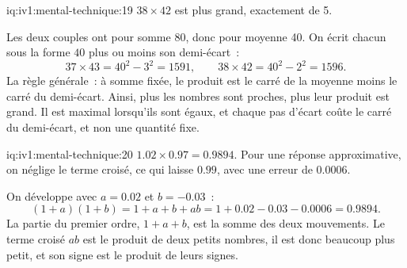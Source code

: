 \begin{solution}{iq:iv1:mental-technique:19}
$38 \times 42$ est plus grand, exactement de 5.

Les deux couples ont pour somme 80, donc pour moyenne 40. On écrit chacun sous la forme $40$ plus ou moins son demi-écart~:
\[
37 \times 43 = 40^2 - 3^2 = 1591, \qquad 38 \times 42 = 40^2 - 2^2 = 1596.
\]
La règle générale~: à somme fixée, le produit est le carré de la moyenne moins le carré du demi-écart. Ainsi, plus les nombres sont proches, plus leur produit est grand. Il est maximal lorsqu'ils sont égaux, et chaque pas d'écart coûte le carré du demi-écart, et non une quantité fixe.

\end{solution}

\begin{solution}{iq:iv1:mental-technique:20}
$1.02 \times 0.97 = 0.9894$. Pour une réponse approximative, on néglige le terme croisé, ce qui laisse $0.99$, avec une erreur de $0.0006$.

On développe avec $a = 0.02$ et $b = -0.03$~:
\[
(1 + a)(1 + b) = 1 + a + b + ab = 1 + 0.02 - 0.03 - 0.0006 = 0.9894.
\]
La partie du premier ordre, $1 + a + b$, est la somme des deux mouvements. Le terme croisé $ab$ est le produit de deux petits nombres, il est donc beaucoup plus petit, et son signe est le produit de leurs signes.

\end{solution}


